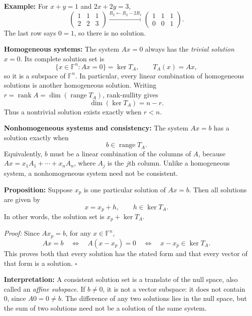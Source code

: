 \documentclass[a4paper,11pt,abstract=true]{scrartcl}
\theoremstyle{dotlessP}
\theoremstyle{dotlessS}
\theoremstyle{remark}
\theoremstyle{definition}
\begin{document}
\begin{example_box}
\textbf{Example:} For
$x+y=1$ and $2x+2y=3$,
\[
\left(\begin{array}{cc|c}1&1&1\\2&2&3\end{array}\right)
\xrightarrow{R_2\leftarrow R_2-2R_1}
\left(\begin{array}{cc|c}1&1&1\\0&0&1\end{array}\right).
\]
The last row says $0=1$, so there is no solution.
\end{example_box}

\begin{claim_box}
\textbf{Homogeneous systems:} The system $Ax=0$ always has the
\emph{trivial solution} $x=0$. Its complete solution set is
\[
\{x\in\mathbb{F}^n:Ax=0\}=\ker T_A,
\qquad T_A(x)=Ax,
\]
so it is a subspace of $\mathbb{F}^n$. In particular, every linear
combination of homogeneous solutions is another homogeneous solution.
Writing $r=\operatorname{rank}A=\dim(\operatorname{range}T_A)$,
rank-nullity gives
\[
\dim(\ker T_A)=n-r.
\]
Thus a nontrivial solution exists exactly when $r<n$.
\end{claim_box}

\begin{claim_box}
\textbf{Nonhomogeneous systems and consistency:} The system
$Ax=b$ has a solution exactly when
\[
b\in\operatorname{range}T_A.
\]
Equivalently, $b$ must be a linear combination of the columns of $A$,
because $Ax=x_1 A_1+\cdots+x_n A_n$, where $A_j$ is the $j$th column.
Unlike a homogeneous system, a nonhomogeneous system need not be
consistent.
\end{claim_box}

\begin{problem_box}
\textbf{Proposition:}
Suppose $x_p$
is one particular solution of $Ax=b$. Then all solutions are given by
\[
x=x_p+h,\qquad h\in\ker T_A.
\]
In other words, the solution set is $x_p+\ker T_A$.
\end{problem_box}

\begin{claim_box}
\textit{Proof:} Since $Ax_p=b$, for any $x\in\mathbb{F}^n$,
\[
Ax=b\quad\Longleftrightarrow\quad A(x-x_p)=0
\quad\Longleftrightarrow\quad x-x_p\in\ker T_A.
\]
This proves both that every solution has the stated form and that every
vector of that form is a solution. \hfill$\square$
\end{claim_box}

\begin{claim_box}
\textbf{Interpretation:} A consistent solution set is a translate
of the null space, also called an \emph{affine subspace}. If $b\neq0$,
it is not a vector subspace: it does not contain $0$, since $A0=0\neq b$.
The difference of any two solutions lies in the null space, but the sum
of two solutions need not be a solution of the same system.
\end{claim_box}
\end{document}
